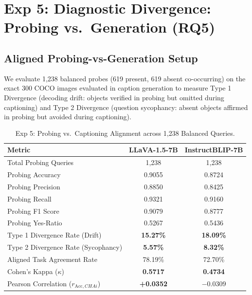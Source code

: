 \documentclass[conference]{IEEEtran}
\begin{document}
\section{Exp 5: Diagnostic Divergence: Probing vs.\ Generation (RQ5)}

\subsection{Aligned Probing-vs-Generation Setup}
We evaluate 1,238 balanced probes (619 present, 619 absent co-occurring) on the exact 300 COCO images evaluated in caption generation to measure Type 1 Divergence (decoding drift: objects verified in probing but omitted during captioning) and Type 2 Divergence (question sycophancy: absent objects affirmed in probing but avoided during captioning).

\begin{table}[htbp]
\caption{Exp 5: Probing vs.\ Captioning Alignment across 1,238 Balanced Queries.}
\label{tab:exp5_divergence}
\centering
\begin{tabular}{lcc}
\toprule
\textbf{Metric} & \textbf{LLaVA-1.5-7B} & \textbf{InstructBLIP-7B} \\
\midrule
Total Probing Queries         & 1,238   & 1,238   \\
Probing Accuracy             & 0.9055  & 0.8724  \\
Probing Precision            & 0.8850  & 0.8425  \\
Probing Recall               & 0.9321  & 0.9160  \\
Probing F1 Score             & 0.9079  & 0.8777  \\
Probing Yes-Ratio            & 0.5267  & 0.5436  \\
\midrule
Type 1 Divergence Rate (Drift)       & \textbf{15.27\%} & \textbf{18.09\%} \\
Type 2 Divergence Rate (Sycophancy)  & \textbf{5.57\%}  & \textbf{8.32\%}  \\
\midrule
Aligned Task Agreement Rate  & 78.19\% & 72.70\% \\
Cohen's Kappa ($\kappa$)     & \textbf{0.5717}  & \textbf{0.4734}  \\
Pearson Correlation ($r_{\text{Acc}, CHAi}$) & \textbf{+0.0352} & $\mathbf{-0.0309}$ \\
\bottomrule
\end{tabular}
\end{table}
\end{document}
